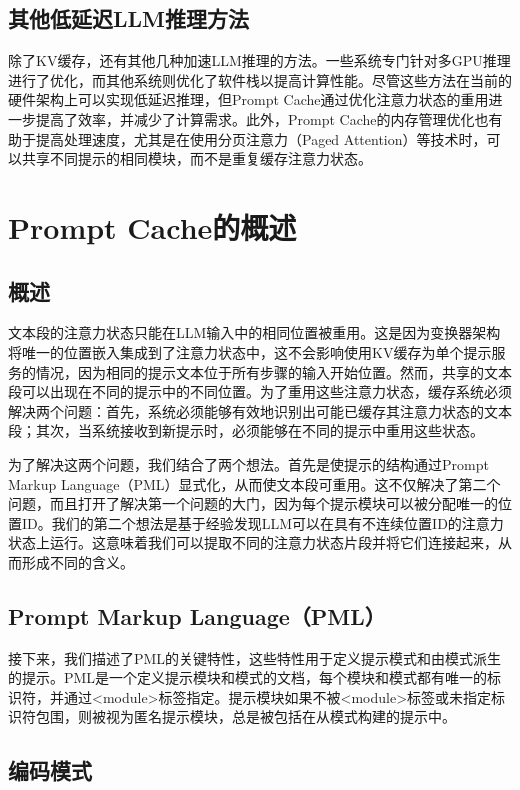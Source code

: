 \documentclass[twocolumn, 10pt]{article} %
\theoremstyle{remark}
\begin{document}
\subsection{其他低延迟LLM推理方法}

除了KV缓存，还有其他几种加速LLM推理的方法。一些系统专门针对多GPU推理进行了优化，而其他系统则优化了软件栈以提高计算性能。尽管这些方法在当前的硬件架构上可以实现低延迟推理，但Prompt Cache通过优化注意力状态的重用进一步提高了效率，并减少了计算需求。此外，Prompt Cache的内存管理优化也有助于提高处理速度，尤其是在使用分页注意力（Paged Attention）等技术时，可以共享不同提示的相同模块，而不是重复缓存注意力状态。


\section{Prompt Cache的概述}

\subsection{概述}

文本段的注意力状态只能在LLM输入中的相同位置被重用。这是因为变换器架构将唯一的位置嵌入集成到了注意力状态中，这不会影响使用KV缓存为单个提示服务的情况，因为相同的提示文本位于所有步骤的输入开始位置。然而，共享的文本段可以出现在不同的提示中的不同位置。为了重用这些注意力状态，缓存系统必须解决两个问题：首先，系统必须能够有效地识别出可能已缓存其注意力状态的文本段；其次，当系统接收到新提示时，必须能够在不同的提示中重用这些状态。

为了解决这两个问题，我们结合了两个想法。首先是使提示的结构通过Prompt Markup Language（PML）显式化，从而使文本段可重用。这不仅解决了第二个问题，而且打开了解决第一个问题的大门，因为每个提示模块可以被分配唯一的位置ID。我们的第二个想法是基于经验发现LLM可以在具有不连续位置ID的注意力状态上运行。这意味着我们可以提取不同的注意力状态片段并将它们连接起来，从而形成不同的含义。

\subsection{Prompt Markup Language（PML）}

接下来，我们描述了PML的关键特性，这些特性用于定义提示模式和由模式派生的提示。PML是一个定义提示模块和模式的文档，每个模块和模式都有唯一的标识符，并通过<module>标签指定。提示模块如果不被<module>标签或未指定标识符包围，则被视为匿名提示模块，总是被包括在从模式构建的提示中。

\subsection{编码模式}
\end{document}

